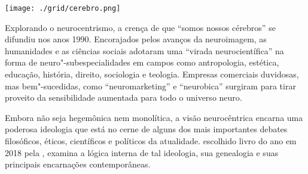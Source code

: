 \vfill

\hspace*{-.4cm}\begin{minipage}[c]{.5\linewidth}
\small{
{}}
\end{minipage}

\pagebreak %

\begin{center}
\hspace*{.5cm}\texttt{[image: ./grid/cerebro.png]}
\end{center}

\hspace*{-7cm}\hrulefill\hspace*{-7cm}

\medskip

\noindent{}Explorando o neurocentrismo, a crença de que “somos nossos cérebros” se difundiu nos anos 1990. Encorajados pelos avanços da neuroimagem, as humanidades e as ciências sociais adotaram uma “virada neurocientífica” na forma de neuro"-subespecialidades em campos como antropologia, estética, educação, história, direito, sociologia e teologia. Empresas comerciais duvidosas, mas bem"-sucedidas, como “neuromarketing” e “neurobica” surgiram para tirar proveito da sensibilidade aumentada para todo o universo neuro.

Embora não seja hegemônica nem monolítica, a visão neurocêntrica encarna uma poderosa ideologia que está no cerne de alguns dos mais importantes debates filosóficos, éticos, científicos e políticos da atualidade. {} escolhido livro do ano em 2018 pela {}, examina a lógica interna de tal ideologia, sua genealogia e suas principais encarnações contemporâneas. 


\vfill

